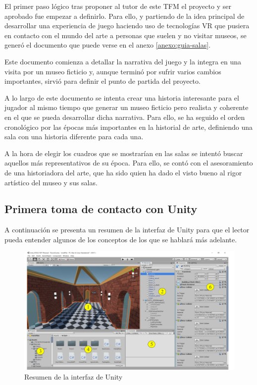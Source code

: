 El primer paso lógico tras proponer al tutor de este \acs{TFM} el proyecto y ser aprobado fue empezar a definirlo. Para ello, y partiendo de la idea principal de desarrollar una experiencia de juego haciendo uso de tecnologías \acs{VR} que pusiera en contacto con el mundo del arte a personas que suelen y no visitar museos, se generó el documento que puede verse en el anexo \ref{anexo:guia-salas}. 

Este documento comienza a detallar la narrativa del juego y la integra en una visita por un museo ficticio y, aunque terminó por sufrir varios cambios importantes, sirvió para definir el punto de partida del proyecto.

A lo largo de este documento se intenta crear una historia interesante para el jugador al mismo tiempo que generar un museo ficticio pero realista y coherente en el que se pueda desarrollar dicha narrativa. Para ello, se ha seguido el orden cronológico por las épocas más importantes en la historial de arte, definiendo una sala con una historia diferente para cada una.

A la hora de elegir los cuadros que se mostrarían en las salas se intentó buscar aquellos más representativos de su época. Para ello, se contó con el asesoramiento de una historiadora del arte, que ha sido quien ha dado el visto bueno al rigor artístico del museo y sus salas.

\subsection{Primera toma de contacto con Unity}

A continuación se presenta un resumen de la interfaz de Unity para que el lector pueda entender algunos de los conceptos de los que se hablará más adelante.

\begin{figure}[!h]
\begin{center}
\includegraphics[width=1\textwidth]{imagenes/7/interfaz-unity.png}
\caption{Resumen de la interfaz de Unity}
\label{fig:interfaz-unity}
\end{center}
\end{figure}

